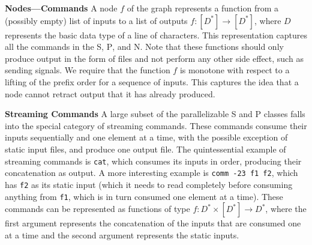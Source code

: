 \documentclass[letterpaper,twocolumn,10pt]{article}
\newcommand{\heading}[1]{\vspace{4pt}\noindent\textbf{#1}\enspace}
\newcommand{\ttt}[1]{\texttt{#1}}
\newcommand{\cn}[1]{\mbox{\textcircled{\footnotesize #1}}}
\newcommand{\tcn}[1]{\mbox{\textcircled{\scriptsize #1}}}
\newcommand{\sta}{\cn{\textsc{S}}\xspace}
\newcommand{\pur}{\cn{\textsc{P}}\xspace}
\newcommand{\tsta}{\tcn{\textsc{S}}\xspace}
\newcommand{\tpur}{\tcn{\textsc{P}}\xspace}
\newcommand{\tnpu}{\tcn{\textsc{N}}\xspace}
\newcommand{\nv}[1]{[{\color{cyan}nv: #1}]}
\newcommand{\kk}[1]{[{\color{magenta}kk: #1}]}
\newcommand{\km}[1]{[{\color{blue}km: #1}]}
\newcommand{\kstar}{^{\textstyle *}}
\begin{document}
\heading{Nodes---Commands}
A node $f$ of the graph represents a function from a (possibly empty)
list of inputs
to a list of outputs
$f : [D\kstar] \to [D\kstar]$, where $D$ represents the basic data
type of a line of characters.
This representation captures all the commands in
the \tsta, \tpur, and \tnpu. Note that these functions should only produce
output in the form of files and not perform any other side effect,
such as sending signals.  We require that the function $f$ is monotone
with respect to a lifting of the prefix order for a sequence of inputs.
This captures the idea that a node cannot retract output that it has
already produced.

\heading{Streaming Commands}
%
A large subset of the parallelizable \tsta and \tpur classes falls
into the special category of streaming commands. These commands
consume their inputs sequentially and one element at a time, with the
possible exception of static input files, and produce one output
file. The quintessential example of streaming commands is \ttt{cat},
which consumes its inputs in order, producing their concatenation as
output. A more interesting example is \ttt{comm -23 f1 f2}, which has
\ttt{f2} as its static input (which it needs to read completely before
consuming anything from \ttt{f1}, which is in turn consumed one
element at a time). These commands can be represented as functions of
type $f : D\kstar \times [D\kstar] \to D\kstar$, where the first
argument represents the concatenation of the inputs that are consumed
one at a time and the second argument represents the static inputs.
\end{document}
